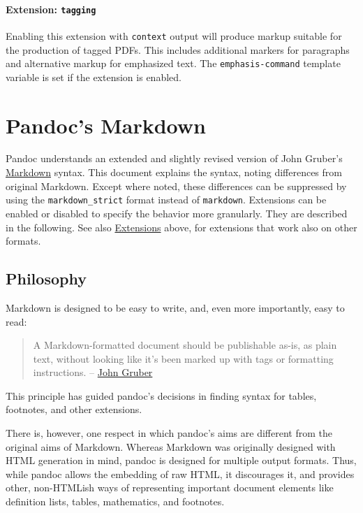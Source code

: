 \documentclass[
  a4paper,
]{article}
\begin{document}
\hypertarget{extension-tagging}{%
\paragraph{\texorpdfstring{Extension:
\texttt{tagging}}{Extension: tagging}}\label{extension-tagging}}

Enabling this extension with \texttt{context} output will produce markup
suitable for the production of tagged PDFs. This includes additional
markers for paragraphs and alternative markup for emphasized text. The
\texttt{emphasis-command} template variable is set if the extension is
enabled.

\hypertarget{pandocs-markdown}{%
\section{Pandoc's Markdown}\label{pandocs-markdown}}

Pandoc understands an extended and slightly revised version of John
Gruber's \href{https://daringfireball.net/projects/markdown/}{Markdown}
syntax. This document explains the syntax, noting differences from
original Markdown. Except where noted, these differences can be
suppressed by using the \texttt{markdown\_strict} format instead of
\texttt{markdown}. Extensions can be enabled or disabled to specify the
behavior more granularly. They are described in the following. See also
\protect\hyperlink{extensions}{Extensions} above, for extensions that
work also on other formats.

\hypertarget{philosophy}{%
\subsection{Philosophy}\label{philosophy}}

Markdown is designed to be easy to write, and, even more importantly,
easy to read:

\begin{quote}
A Markdown-formatted document should be publishable as-is, as plain
text, without looking like it's been marked up with tags or formatting
instructions. --
\href{https://daringfireball.net/projects/markdown/syntax\#philosophy}{John
Gruber}
\end{quote}

This principle has guided pandoc's decisions in finding syntax for
tables, footnotes, and other extensions.

There is, however, one respect in which pandoc's aims are different from
the original aims of Markdown. Whereas Markdown was originally designed
with HTML generation in mind, pandoc is designed for multiple output
formats. Thus, while pandoc allows the embedding of raw HTML, it
discourages it, and provides other, non-HTMLish ways of representing
important document elements like definition lists, tables, mathematics,
and footnotes.
\end{document}
